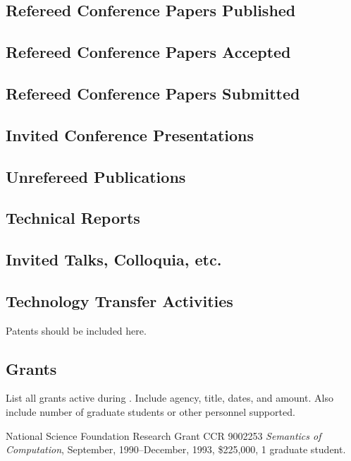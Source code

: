\subsection{Refereed Conference Papers Published}

\subsection{Refereed Conference Papers Accepted} 

\subsection{Refereed Conference Papers Submitted}

\subsection{Invited Conference Presentations}

\subsection{Unrefereed Publications}

\subsection{Technical Reports}

\subsection{Invited Talks, Colloquia, etc.}

\subsection{Technology Transfer Activities}

Patents should be included here.

\subsection{Grants}

List all grants active during \reportyear.  Include agency, title, dates, and
amount.  Also include number of graduate students or other personnel
supported.

National Science Foundation Research Grant CCR 9002253
{\it {Semantics of Computation}\/}, September, 1990--December, 1993,
\$225,000, 1 graduate student.


